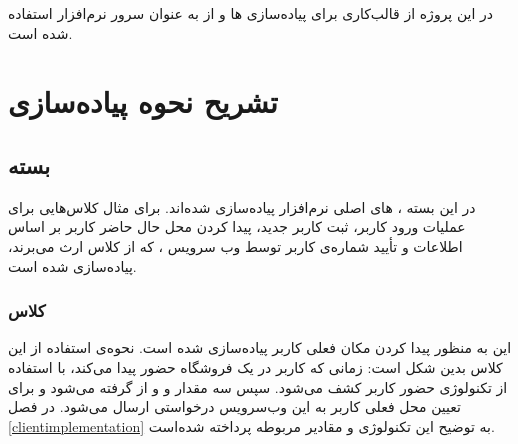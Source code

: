 \documentclass[oneside]{report}
\begin{document}
در این پروژه از قالب‌کاری 
{\normalsize{}}
برای پیاده‌سازی 
{\normalsize{}} ها 
و از 
{\normalsize{}}
به عنوان سرور نرم‌افزار
استفاده شده ‌است.

\section{تشریح نحوه پیاده‌سازی}
	\subsection{بسته {\small{}}}
	در این بسته 
،
{\normalsize{}} های 
اصلی نرم‌افزار پیاده‌سازی شده‌اند. برای مثال کلاس‌هایی برای عملیات ورود کاربر، ثبت کاربر جدید، پیدا کردن محل حال حاضر کاربر بر اساس اطلاعات 
{\normalsize{}}
و تأیید شماره‌ی کاربر توسط وب سرویس 
{\normalsize{}}،  که از کلاس
{\normalsize{}}
ارث می‌برند، پیاده‌سازی شده است. 

\subsubsection{کلاس     {\small{}}}
این 
{\normalsize{}}
 به منظور پیدا کردن مکان فعلی کاربر پیاده‌سازی شده است. نحوه‌ی استفاده از این کلاس بدین شکل است: زمانی که کاربر در یک فروشگاه حضور پیدا می‌کند، با استفاده از تکنولوژی 
 {\normalsize{}}
 حضور کاربر کشف می‌شود. سپس سه مقدار 
 {\normalsize{}}
 و 
 {\normalsize{}}
 و 
 {\normalsize{}}
 از 
 {\normalsize{}}
 گرفته می‌شود و برای تعیین محل فعلی کاربر به این وب‌سرویس درخواستی ارسال می‌شود. در فصل 
 \ref{clientimplementation}
 به توضیح این تکنولوژی و مقادیر مربوطه پرداخته شده‌است. 
 
\end{document}
